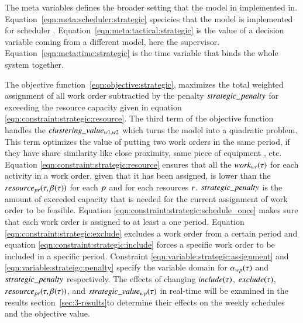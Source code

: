 The meta variables defines the broader setting that the model in implemented in.
Equation~\eqref{eqn:meta:scheduler:strategic} specicies that the model is
implemented for scheduler \ElementScheduler. Equation~\eqref{eqn:meta:tactical:strategic} is the value
of a decision variable coming from a different model, here the supervisor. 
Equation~\eqref{eqn:meta:time:strategic} is the time variable that binds the whole 
system together. 

The objective function~\eqref{eqn:objective:strategic},  maximizes the total
weighted assignment of all work order subtractied by the penalty $strategic\_penalty$
for exceeding the resource capacity given in equation
\eqref{eqn:constraint:strategic:resource}. The third term of the objective
function handles the $clustering\_value_{w1, w2}$ which turns the model into a quadratic
problem. This term optimizes the value of putting two work orders in the same
period, if they have share similarity like close proximity, same piece of equipment
, etc.  Equation \eqref{eqn:constraint:strategic:resource} ensures
that all the $work_{wr}(\tau)$ for each activity in a work
order, given that it has been assigned, is lower than the $resource_{pr}(\tau, \beta_{}(\tau))$ for each
$p$ and for each resources $r$. $strategic\_penalty$ is the
amount of exceeded capacity that is needed for the current assignment of work
order to be feasible. Equation \eqref{eqn:constraint:strategic:schedule_once}
makes sure that each work order is assigned to at least a one
period. Equation \eqref{eqn:constraint:strategic:exclude}
excludes a work order from a certain period and equation
\eqref{eqn:constraint:strategic:include} forces a specific work order to be
included in a specific period. Constraint \eqref{eqn:variable:strategic:assignment}
and \eqref{eqn:variable:strateigc:penalty} specify the variable domain
for $\alpha_{wp}(\tau)$
and $strategic\_penalty$ respectively. The effects of changing $
include(\tau)$, $exclude(\tau)$, $resource_{pr}(\tau, \beta_{}(\tau))$, and $
strategic\_value_{w p}(\tau)$ in real-time will be examined in the results section~\ref{sec:3-results}to 
determine their effects on the weekly schedules and the objective value.
